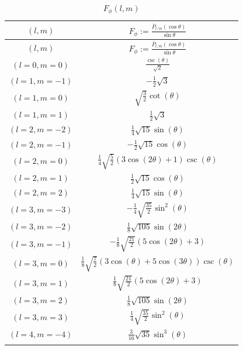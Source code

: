 \begin{center}
\begin{longtable}{|c|c|}
\caption{$F_\phi(l,m)$} \\
\hline
\boldmath \rule[-9pt]{0pt}{21pt}$(l,m)$ & $F_\phi := \frac{\bar{P}_{l,m}(\cos\theta)}{\sin\theta}$\unboldmath \\
\hline
\endfirsthead
\hline
\boldmath \rule[-9pt]{0pt}{21pt}$(l,m)$ & $F_\phi := \frac{\bar{P}_{l,m}(\cos\theta)}{\sin\theta}$\unboldmath \\
\hline
\endhead
$(l=0, m=0)$ & $\frac{\csc (\theta )}{\sqrt{2}}$ \\ \hline
\rowcolor{gray!15}
$(l=1, m=-1)$ & $-\frac{1}{2} \sqrt{3}$ \\ \hline
$(l=1, m=0)$ & $\sqrt{\frac{3}{2}} \cot (\theta )$ \\ \hline
\rowcolor{gray!15}
$(l=1, m=1)$ & $\frac{1}{2} \sqrt{3}$ \\ \hline
$(l=2, m=-2)$ & $\frac{1}{4} \sqrt{15} \sin (\theta )$ \\ \hline
\rowcolor{gray!15}
$(l=2, m=-1)$ & $-\frac{1}{2} \sqrt{15} \cos (\theta )$ \\ \hline
$(l=2, m=0)$ & $\frac{1}{4} \sqrt{\frac{5}{2}} (3 \cos (2 \theta )+1) \csc (\theta )$ \\ \hline
\rowcolor{gray!15}
$(l=2, m=1)$ & $\frac{1}{2} \sqrt{15} \cos (\theta )$ \\ \hline
$(l=2, m=2)$ & $\frac{1}{4} \sqrt{15} \sin (\theta )$ \\ \hline
\rowcolor{gray!15}
$(l=3, m=-3)$ & $-\frac{1}{4} \sqrt{\frac{35}{2}} \sin ^2(\theta )$ \\ \hline
$(l=3, m=-2)$ & $\frac{1}{8} \sqrt{105} \sin (2 \theta )$ \\ \hline
\rowcolor{gray!15}
$(l=3, m=-1)$ & $-\frac{1}{8} \sqrt{\frac{21}{2}} (5 \cos (2 \theta )+3)$ \\ \hline
$(l=3, m=0)$ & $\frac{1}{8} \sqrt{\frac{7}{2}} (3 \cos (\theta )+5 \cos (3 \theta )) \csc (\theta )$ \\ \hline
\rowcolor{gray!15}
$(l=3, m=1)$ & $\frac{1}{8} \sqrt{\frac{21}{2}} (5 \cos (2 \theta )+3)$ \\ \hline
$(l=3, m=2)$ & $\frac{1}{8} \sqrt{105} \sin (2 \theta )$ \\ \hline
\rowcolor{gray!15}
$(l=3, m=3)$ & $\frac{1}{4} \sqrt{\frac{35}{2}} \sin ^2(\theta )$ \\ \hline
$(l=4, m=-4)$ & $\frac{3}{16} \sqrt{35} \sin ^3(\theta )$ \\ \hline
\rowcolor{gray!15}

\end{longtable}
\end{center}
